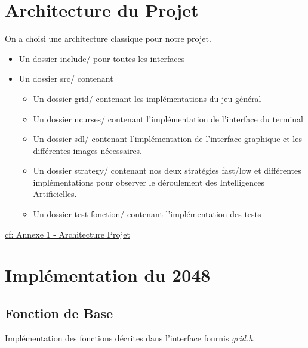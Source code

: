 \documentclass[a4paper]{article}
\begin{document}
 \section{Architecture du Projet}
 \label{sec-2}

 On a choisi une architecture classique pour notre projet.
 \begin{itemize}
 \item Un dossier include/ pour toutes les interfaces
 \item Un dossier src/ contenant
 \begin{itemize}
 \item Un dossier grid/ contenant les implémentations du jeu général
 \item Un dossier ncurses/ contenant l'implémentation de l'interface du terminal
 \item Un dossier sdl/ contenant l'implémentation de l'interface graphique et les différentes images nécessaires.
 \item Un dossier strategy/ contenant nos deux stratégies fast/low et différentes implémentations pour observer le 
 déroulement des Intelligences Artificielles.
 \item Un dossier test-fonction/ contenant l'implémentation des tests
 \end{itemize}
 \end{itemize}


 \hyperref[sec-7-1]{cf: Annexe 1 - Architecture Projet}
 \newpage
 \section{Implémentation du 2048}
 \label{sec-3}
 \subsection{Fonction de Base}
 \label{sec-3-1}
 Implémentation des fonctions décrites dans l'interface fournis
 \emph{grid.h}.
\end{document}
